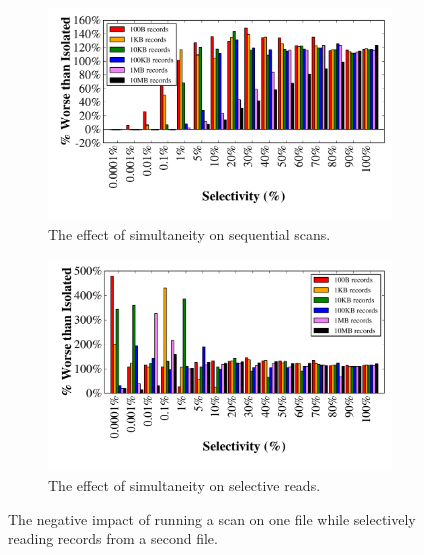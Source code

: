 \begin{figure}
  \centering
  \begin{subfigure}[b]{\textwidth}
    \centering
    \includegraphics[width=\textwidth]{fault_tolerance/graphs/simultaneous_scan_different_files}
    \caption{\label{fig:simultaneous_different_files_scan} The effect of
      simultaneity on sequential scans.}
  \end{subfigure}
  \begin{subfigure}[b]{\textwidth}
    \centering
    \includegraphics[width=\textwidth]{fault_tolerance/graphs/simultaneous_seek_different_files}
    \caption{\label{fig:simultaneous_different_files_seek} The effect of
      simultaneity on selective reads.}
  \end{subfigure}
  \caption{\label{fig:simultaneous_different_files} The negative impact of
    running a scan on one file while selectively reading records from a
    second file.}
\end{figure}

